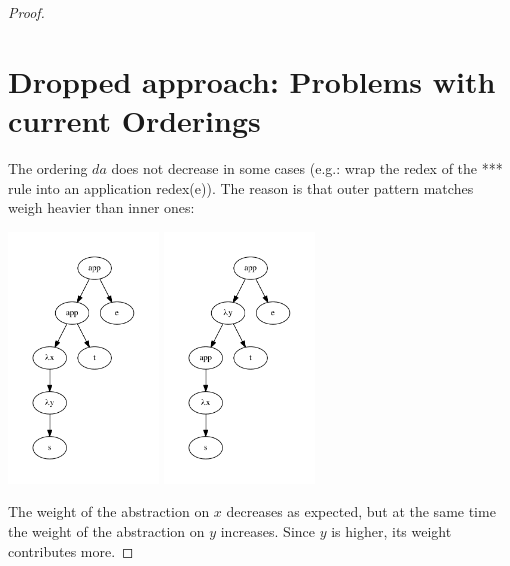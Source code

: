 \documentclass[a4paper]{article}
\begin{document}
\begin{proof}
\section{Dropped approach: Problems with current Orderings}
The ordering $da$ does not decrease in some cases (e.g.: wrap the redex of
  the *** rule into an application redex(e)). The reason is that outer pattern
  matches weigh heavier than inner ones:
  \begin{center}
    \includegraphics[width=4cm]{measure_ce1.pdf}
    \includegraphics[width=4cm]{measure_ce2.pdf}
  \end{center}

The weight of the abstraction on $x$ decreases as expected, but at the same time
the weight of the abstraction on $y$ increases. Since $y$ is higher, its weight
contributes more.

\end{proof}
\end{document}
